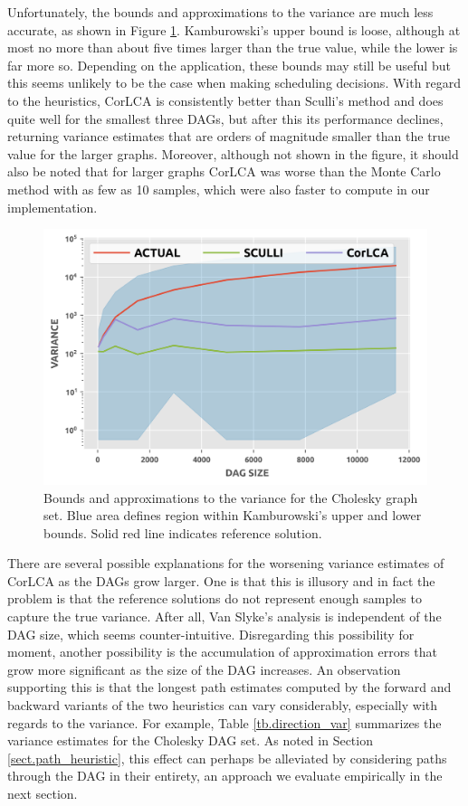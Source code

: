 \documentclass[12pt]{article}
\begin{document}
      Unfortunately, the bounds and approximations to the variance are much less accurate, as shown in Figure \ref{plot.variance_existing}. Kamburowski's upper bound is loose, although at most no more than about five times larger than the true value, while the lower is far more so. Depending on the application, these bounds may still be useful but this seems unlikely to be the case when making scheduling decisions. With regard to the heuristics, CorLCA is consistently better than Sculli's method and does quite well for the smallest three DAGs, but after this its performance declines, returning variance estimates that are orders of magnitude smaller than the true value for the larger graphs. Moreover, although not shown in the figure, it should also be noted that for larger graphs CorLCA was worse than the Monte Carlo method with as few as 10 samples, which were also faster to compute in our implementation.

      \begin{figure}
	\centering	
	\includegraphics[scale=1.0]{variance_bounds.png}
	\caption{Bounds and approximations to the variance for the Cholesky graph set. Blue area defines region within Kamburowski's upper and lower bounds. Solid red line indicates reference solution.}	
	\label{plot.variance_existing}
      \end{figure}

      There are several possible explanations for the worsening variance estimates of CorLCA as the DAGs grow larger. One is that this is illusory and in fact the problem is that the reference solutions do not represent enough samples to capture the true variance. After all, Van Slyke's analysis is independent of the DAG size, which seems counter-intuitive. Disregarding this possibility for moment, another possibility is the accumulation of approximation errors that grow more significant as the size of the DAG increases. An observation supporting this is that the longest path estimates computed by the forward and backward variants of the two heuristics can vary considerably, especially with regards to the variance. For example, Table \ref{tb.direction_var} summarizes the variance estimates for the Cholesky DAG set. As noted in Section \ref{sect.path_heuristic}, this effect can perhaps be alleviated by considering paths through the DAG in their entirety, an approach we evaluate empirically in the next section.
\end{document}
